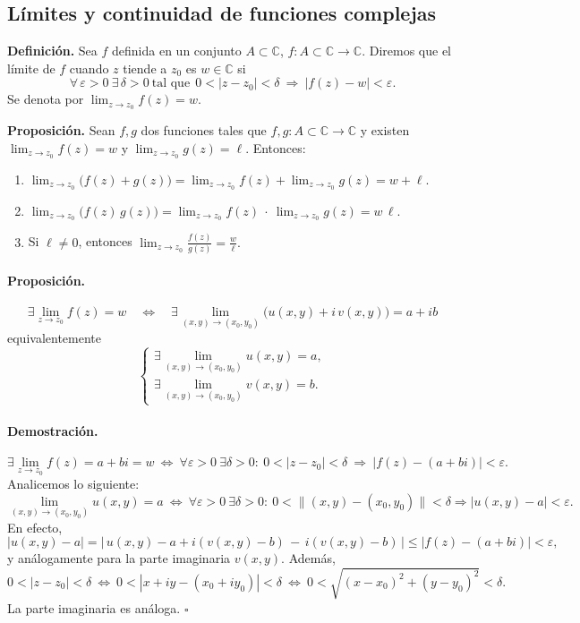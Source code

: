 \documentclass[a4paper,12pt]{article}
\begin{document}
\subsection{Límites y continuidad de funciones complejas}

\textbf{Definición.} Sea $f$ definida en un conjunto $A\subset\mathbb{C}$, $f:A\subset\mathbb{C}\to\mathbb{C}$. Diremos que el límite de $f$ cuando $z$ tiende a $z_0$ es $w\in\mathbb{C}$ si
\[
\forall\,\varepsilon>0\ \exists\,\delta>0\ \text{tal que}\ \ 0<|z-z_0|<\delta \ \Rightarrow\ |f(z)-w|<\varepsilon.
\]
Se denota por \(\displaystyle \lim_{z\to z_0} f(z)=w\).

\medskip

\textbf{Proposición.} Sean $f,g$ dos funciones tales que $f,g:A\subset\mathbb{C}\to\mathbb{C}$ y existen
\(\displaystyle \lim_{z\to z_0} f(z)=w\) y \(\displaystyle \lim_{z\to z_0} g(z)=\ell\). Entonces:
\begin{enumerate}
  \item \(\displaystyle \lim_{z\to z_0} \big(f(z)+g(z)\big)
  = \lim_{z\to z_0} f(z) + \lim_{z\to z_0} g(z) = w+\ell.\)
  \item \(\displaystyle \lim_{z\to z_0} \big(f(z)\,g(z)\big)
  = \lim_{z\to z_0} f(z)\ \cdot\ \lim_{z\to z_0} g(z) = w\,\ell.\)
  \item Si \(\ell\neq 0\), entonces \(\displaystyle
  \lim_{z\to z_0} \frac{f(z)}{g(z)} = \frac{w}{\ell}.\)
\end{enumerate}
\newpage
\paragraph{Proposición.}
\[
\exists \lim_{z\to z_0} f(z)=w \quad\Longleftrightarrow\quad
\exists \lim_{(x,y)\to(x_0,y_0)} \bigl(u(x,y)+i\,v(x,y)\bigr)=a+ib
\]
equivalentemente
\[
\begin{cases}
\displaystyle \exists \lim_{(x,y)\to(x_0,y_0)} u(x,y)=a,\\[4pt]
\displaystyle \exists \lim_{(x,y)\to(x_0,y_0)} v(x,y)=b.
\end{cases}
\]

\paragraph{Demostración.}
\[
\exists \lim_{z\to z_0} f(z)=a+bi=w
\ \Longleftrightarrow\
\forall \varepsilon>0\ \exists \delta>0:\ 0<|z-z_0|<\delta \ \Rightarrow\ |f(z)-(a+bi)|<\varepsilon .
\]
Analicemos lo siguiente:
\[
\lim_{(x,y)\to(x_0,y_0)} u(x,y)=a
\ \Longleftrightarrow\
\forall \varepsilon>0\ \exists \delta>0:\ 0<\| (x,y)-(x_0,y_0)\|<\delta \Rightarrow |u(x,y)-a|<\varepsilon .
\]
En efecto,
\[
|u(x,y)-a|
=\bigl|\,u(x,y)-a+i(v(x,y)-b)\,-\,i(v(x,y)-b)\,\bigr|
\le |f(z)-(a+bi)|
<\varepsilon,
\]
y análogamente para la parte imaginaria \(v(x,y)\).
Además,
\[
0<|z-z_0|<\delta
\ \Longleftrightarrow\
0<|x+iy-(x_0+iy_0)|<\delta
\ \Longleftrightarrow\
0<\sqrt{(x-x_0)^2+(y-y_0)^2}<\delta .
\]
La parte imaginaria es análoga. \(\square\)
\end{document}
